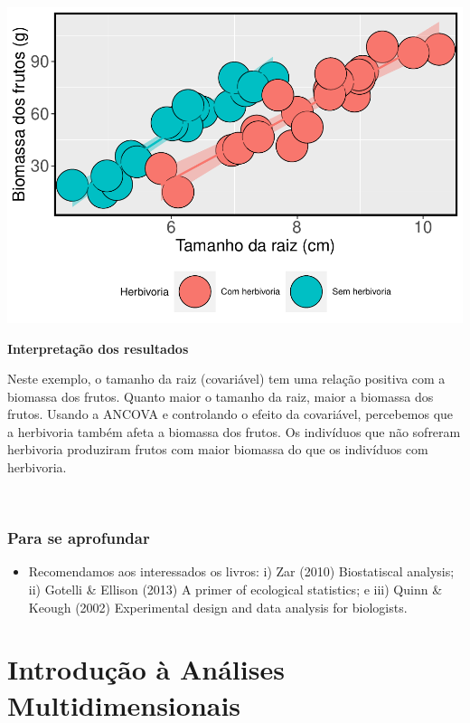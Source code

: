 \documentclass[
]{book}
\providecommand{\tightlist}{%
  \setlength{\itemsep}{0pt}\setlength{\parskip}{0pt}}
\begin{document}
\includegraphics{livro_r_ecologia_files/figure-latex/unnamed-chunk-23-1.pdf}

\textbf{Interpretação dos resultados}

Neste exemplo, o tamanho da raiz (covariável) tem uma relação positiva com a biomassa dos frutos. Quanto maior o tamanho da raiz, maior a biomassa dos frutos. Usando a ANCOVA e controlando o efeito da covariável, percebemos que a herbivoria também afeta a biomassa dos frutos. Os indivíduos que não sofreram herbivoria produziram frutos com maior biomassa do que os indivíduos com herbivoria.

~

\hypertarget{para-se-aprofundar}{%
\subsection{Para se aprofundar}\label{para-se-aprofundar}}

\begin{itemize}
\tightlist
\item
  Recomendamos aos interessados os livros: i) Zar (2010) Biostatiscal analysis; ii) Gotelli \& Ellison (2013) A primer of ecological statistics; e iii) Quinn \& Keough (2002) Experimental design and data analysis for biologists.
\end{itemize}

\hypertarget{introduuxe7uxe3o-uxe0-anuxe1lises-multidimensionais}{%
\chapter{Introdução à Análises Multidimensionais}\label{introduuxe7uxe3o-uxe0-anuxe1lises-multidimensionais}}
\end{document}
